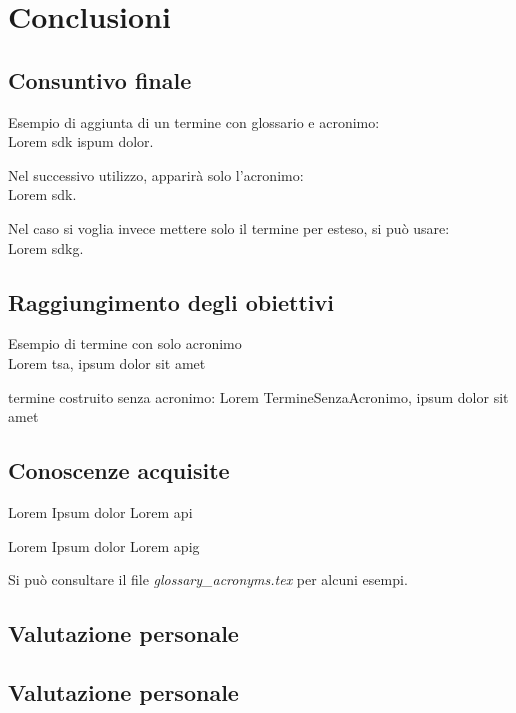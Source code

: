 \chapter{Conclusioni}
\label{chap:conclusioni}

\section{Consuntivo finale}
Esempio di aggiunta di un termine con glossario e acronimo:\\
Lorem \gls{sdk} ispum dolor.

Nel successivo utilizzo, apparirà solo l'acronimo:\\
Lorem \gls{sdk}.

Nel caso si voglia invece mettere solo il termine per esteso, si può usare:\\
Lorem \gls{sdkg}.

\section{Raggiungimento degli obiettivi}
Esempio di termine con solo acronimo\\
Lorem \gls{tsa}, ipsum dolor sit amet

termine costruito senza acronimo:
Lorem \gls{TermineSenzaAcronimo}, ipsum dolor sit amet

\section{Conoscenze acquisite}
Lorem Ipsum dolor Lorem \gls{api}

Lorem Ipsum dolor Lorem \gls{apig}

Si può consultare il file \textit{glossary\_acronyms.tex} per alcuni esempi.

\section{Valutazione personale}


\section{Valutazione personale}


\newpage